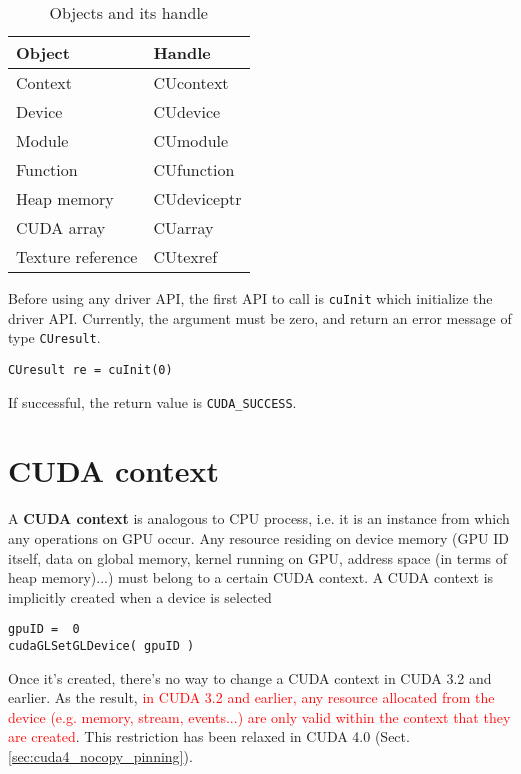 \begin{table}[hbt]
  \begin{center}
    \caption{Objects and its handle}
    \begin{tabular}{ll} 
      \hline
      Object & Handle \\ 
      \hline\hline
      Context & CUcontext \\
      Device & CUdevice \\
      Module & CUmodule \\
      Function & CUfunction \\
      Heap memory & CUdeviceptr \\
      CUDA array & CUarray \\
      Texture reference & CUtexref
    \end{tabular}
  \end{center}
  \label{tab:CU_handles}
\end{table}

\begin{framed}
  Before using any driver API, the first API to call is \verb!cuInit!
  which initialize the driver API. Currently, the argument must be zero,
  and return an error message of type \verb!CUresult!.
\begin{lstlisting}
CUresult re = cuInit(0)
\end{lstlisting}
  If successful, the return value is \verb!CUDA_SUCCESS!.
\end{framed}


\section{CUDA context}
\label{sec:cuda-context}

A {\bf CUDA context} is analogous to CPU process, i.e. it is an instance from
which any operations on GPU occur. Any resource residing on device memory (GPU
ID itself, data on global memory, kernel running on GPU, address space (in terms
of heap memory)...) must belong to a certain CUDA context. A CUDA context is
implicitly created when a device is selected
\begin{verbatim}
gpuID =  0
cudaGLSetGLDevice( gpuID )
\end{verbatim}

Once it's created, there's no way to change a CUDA context in CUDA 3.2 and
earlier. As the result, \textcolor{red}{in CUDA 3.2 and earlier, any resource
allocated from the device (e.g. memory, stream, events...)  are only valid
within the context that they are created}. This restriction has been relaxed in
CUDA 4.0 (Sect.\ref{sec:cuda4_nocopy_pinning}).
  
